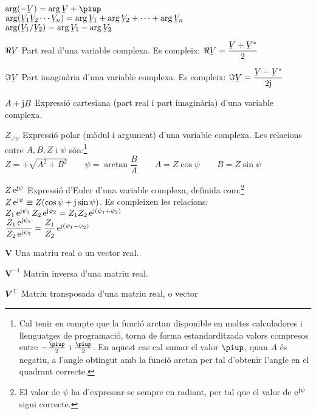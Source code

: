 \begin{list}{}
      $\arg(-\cmplx{V}) =  \arg\cmplx{V} + \piup$\\[1ex]
      $\arg(\cmplx{V}_1 \cmplx{V}_2 \cdots \cmplx{V}_n) = \arg\cmplx{V}_1 + \arg \cmplx{V}_2 + \cdots + \arg\cmplx{V}_n$\\[1ex]
      $\arg(\cmplx{V}_1 / \cmplx{V}_2) = \arg\cmplx{V}_1 - \arg \cmplx{V}_2$
    \item[$\Re\cmplx{V}$] Part real d'una variable complexa. Es compleix: $\Re\cmplx{V} = \dfrac{\cmplx{V} + \cmplx{V}^*}{2}$
    \item[$\Im\cmplx{V}$] Part imaginària d'una variable complexa. Es compleix: $\Im\cmplx{V} = \dfrac{\cmplx{V} - \cmplx{V}^*}{2 \ju}$
    \item[$A+\mathrm{j} B$] Expressió cartesiana (part real i part
    imaginària) d'una variable complexa.
    \item[$Z_{\angle \psi}$] Expressió polar (mòdul i argument) d'una variable
    complexa. Les relacions entre $A, B, Z$ i $\psi$ són:\footnote{Cal tenir en compte que la funció \textsf{arctan} disponible en moltes calculadores i llenguatges de programació, torna de forma  estandarditzada valors compresos entre $-\frac{\piup}{2}$ i $\frac{\piup}{2}$. En aquest cas cal sumar el valor $\piup$, quan $A$ és negatiu, a l'angle obtingut amb la funció \textsf{arctan} per tal d'obtenir l'angle en el quadrant correcte.}\\[1ex]
    $Z=+\sqrt{A^2+B^2}\quad\quad\psi=\arctan{\dfrac{B}{A}}\quad\quad
    A=Z\cos\psi\quad\quad B=Z\sin\psi$
    \item[$Z\,\mathrm{e}^{\mathrm{j}\psi}$] Expressió d'Euler d'una variable complexa, definida com:\footnote{El valor de $\psi$ ha d'expressar-se sempre en radiant, per tal que el valor de $\mathrm{e}^{\mathrm{j}\psi}$ sigui correcte.}
     $Z\,\mathrm{e}^{\mathrm{j}\psi} \equiv Z(\cos\psi+\mathrm{j}\sin\psi)$.
     Es compleixen les relacions:\\[1ex]
     $Z_1\,\mathrm{e}^{\mathrm{j}\psi_1} \, Z_2\,\mathrm{e}^{\mathrm{j}\psi_2} = Z_1 Z_2\,\mathrm{e}^{\mathrm{j}(\psi_1+\psi_2)}$\\[1ex]
     $\dfrac{Z_1\,\mathrm{e}^{\mathrm{j}\psi_1}}{Z_2\,\mathrm{e}^{\mathrm{j}\psi_2}} = \dfrac{Z_1}{Z_2}\,\mathrm{e}^{\mathrm{j}(\psi_1-\psi_2)}$
    \item[$\boldsymbol{V}$] Una matriu real o un vector real.
    \item[$\boldsymbol{V}^{-1}$] Matriu inversa d'una matriu real.
    \item[$\boldsymbol{V}^\mathrm{\textsf{T}}$] Matriu transposada d'una matriu real, o vector

\end{list}
